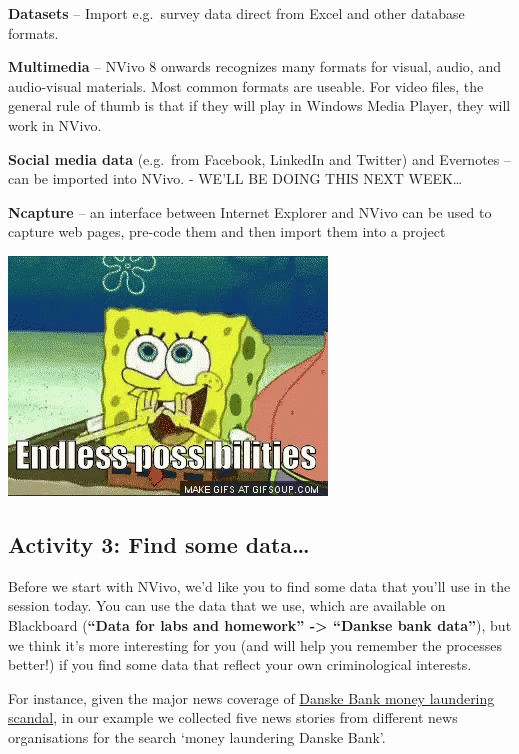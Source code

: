 \documentclass[
]{book}
\begin{document}
\textbf{Datasets} -- Import e.g.~survey data direct from Excel and other database formats.

\textbf{Multimedia} -- NVivo 8 onwards recognizes many formats for visual, audio, and audio-visual materials. Most common formats are useable. For video files, the general rule of thumb is that if they will play in Windows Media Player, they will work in NVivo.

\textbf{Social media data} (e.g.~from Facebook, LinkedIn and Twitter) and Evernotes -- can be imported into NVivo. - WE'LL BE DOING THIS NEXT WEEK\ldots{}

\textbf{Ncapture} -- an interface between Internet Explorer and NVivo can be used to capture web pages, pre-code them and then import them into a project

\includegraphics{imgs/endless-possibilities.gif}

\hypertarget{activity-3-find-some-data}{%
\subsection{Activity 3: Find some data\ldots{}}\label{activity-3-find-some-data}}

Before we start with NVivo, we'd like you to find some data that you'll use in the session today. You can use the data that we use, which are available on Blackboard (\textbf{``Data for labs and homework'' -\textgreater{} ``Dankse bank data''}), but we think it's more interesting for you (and will help you remember the processes better!) if you find some data that reflect your own criminological interests.

For instance, given the major news coverage of \href{https://en.wikipedia.org/wiki/Danske_Bank_money_laundering_scandal}{Danske Bank money laundering scandal}, in our example we collected five news stories from different news organisations for the search `money laundering Danske Bank'.
\end{document}
